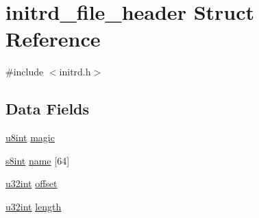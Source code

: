 \hypertarget{structinitrd__file__header}{
\section{initrd\_\-file\_\-header Struct Reference}
\label{structinitrd__file__header}
}


{\ttfamily \#include $<$initrd.h$>$}

\subsection*{Data Fields}
\begin{DoxyCompactItemize}
\item 
\hyperlink{library_8h_a1026e682ffdadc1701c42cd44ce9efcf}{u8int} \hyperlink{structinitrd__file__header_a04da1f4036c5c1453e6f6b9c8656ae1c}{magic}
\item 
\hyperlink{library_8h_afa805b2bbcb6f0e85de57cef336f98df}{s8int} \hyperlink{structinitrd__file__header_a9ae4535aa9418230183438e85d054c9b}{name} \mbox{[}64\mbox{]}
\item 
\hyperlink{library_8h_ad7ecf93b77285d9bf039d27fa3f1a588}{u32int} \hyperlink{structinitrd__file__header_aa1d165d830b3ec7f9523dcb357883cb9}{offset}
\item 
\hyperlink{library_8h_ad7ecf93b77285d9bf039d27fa3f1a588}{u32int} \hyperlink{structinitrd__file__header_aeec37a8314ab06b3088adcc9ae433fa4}{length}
\end{DoxyCompactItemize}


